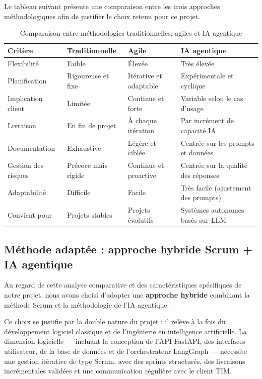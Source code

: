 \documentclass[12pt,a4paper]{report}
\begin{document}
Le tableau suivant présente une comparaison entre les trois approches méthodologiques afin de justifier le choix retenu pour ce projet.

\begin{table}[H]
\centering
\caption{Comparaison entre méthodologies traditionnelles, agiles et IA agentique}
\label{tab:comparaison_methodes}
\begin{tabularx}{\textwidth}{|l|X|X|X|}
\hline
\textbf{Critère} & \textbf{Traditionnelle} & \textbf{Agile} & \textbf{IA agentique} \\
\hline
Flexibilité & Faible & Élevée & Très élevée \\
\hline
Planification & Rigoureuse et fixe & Itérative et adaptable & Expérimentale et cyclique \\
\hline
Implication client & Limitée & Continue et forte & Variable selon le cas d'usage \\
\hline
Livraison & En fin de projet & À chaque itération & Par incrément de capacité IA \\
\hline
Documentation & Exhaustive & Légère et ciblée & Centrée sur les prompts et données \\
\hline
Gestion des risques & Précoce mais rigide & Continue et proactive & Centrée sur la qualité des réponses \\
\hline
Adaptabilité & Difficile & Facile & Très facile (ajustement des prompts) \\
\hline
Convient pour & Projets stables & Projets évolutifs & Systèmes autonomes basés sur LLM \\
\hline
\end{tabularx}
\end{table}

\subsection{Méthode adaptée : approche hybride Scrum + IA agentique}

Au regard de cette analyse comparative et des caractéristiques spécifiques de notre projet, nous avons choisi d'adopter une \textbf{approche hybride} combinant la méthode Scrum et la méthodologie de l'IA agentique.

Ce choix se justifie par la double nature du projet : il relève à la fois du développement logiciel classique et de l'ingénierie en intelligence artificielle. La dimension logicielle --- incluant la conception de l'API FastAPI, des interfaces utilisateur, de la base de données et de l'orchestrateur LangGraph --- nécessite une gestion itérative de type Scrum, avec des sprints structurés, des livraisons incrémentales validées et une communication régulière avec le client TIM.
\end{document}
